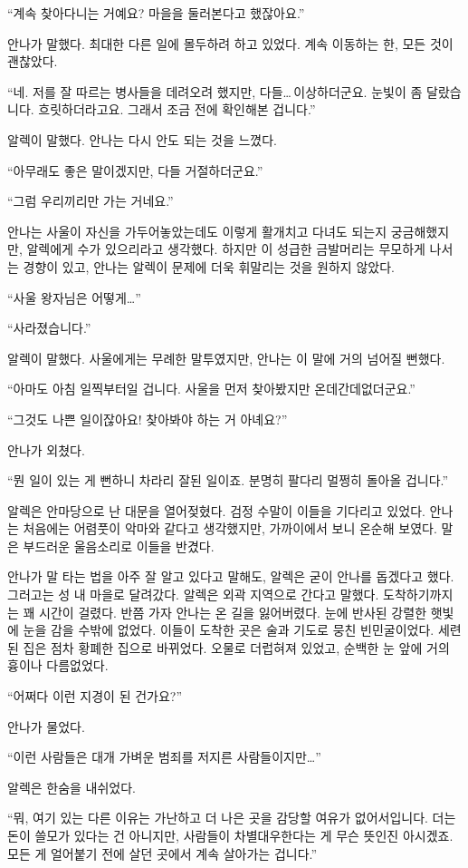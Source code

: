 ``계속 찾아다니는 거예요? 마을을 둘러본다고 했잖아요.''

안나가 말했다. 최대한 다른 일에 몰두하려 하고 있었다. 계속 이동하는 한, 모든 것이 괜찮았다.

``네. 저를 잘 따르는 병사들을 데려오려 했지만, 다들\ldots\,이상하더군요. 눈빛이 좀 달랐습니다. 흐릿하더라고요. 그래서 조금 전에 확인해본 겁니다.''

알렉이 말했다. 안나는 다시 안도 되는 것을 느꼈다.

``아무래도 좋은 말이겠지만, 다들 거절하더군요.''

``그럼 우리끼리만 가는 거네요.''

안나는 사울이 자신을 가두어놓았는데도 이렇게 활개치고 다녀도 되는지 궁금해했지만, 알렉에게 수가 있으리라고 생각했다. 하지만 이 성급한 금발머리는 무모하게 나서는 경향이 있고, 안나는 알렉이 문제에 더욱 휘말리는 것을 원하지 않았다.

``사울 왕자님은 어떻게\ldots''

``사라졌습니다.''

알렉이 말했다. 사울에게는 무례한 말투였지만, 안나는 이 말에 거의 넘어질 뻔했다.

``아마도 아침 일찍부터일 겁니다. 사울을 먼저 찾아봤지만 온데간데없더군요.''

``그것도 나쁜 일이잖아요! 찾아봐야 하는 거 아녜요?''

안나가 외쳤다.

``뭔 일이 있는 게 뻔하니 차라리 잘된 일이죠. 분명히 팔다리 멀쩡히 돌아올 겁니다.''

알렉은 안마당으로 난 대문을 열어젖혔다. 검정 수말이 이들을 기다리고 있었다. 안나는 처음에는 어렴풋이 악마와 같다고 생각했지만, 가까이에서 보니 온순해 보였다. 말은 부드러운 울음소리로 이들을 반겼다.

안나가 말 타는 법을 아주 잘 알고 있다고 말해도, 알렉은 굳이 안나를 돕겠다고 했다. 그러고는 성 내 마을로 달려갔다. 알렉은 외곽 지역으로 간다고 말했다. 도착하기까지는 꽤 시간이 걸렸다. 반쯤 가자 안나는 온 길을 잃어버렸다. 눈에 반사된 강렬한 햇빛에 눈을 감을 수밖에 없었다. 이들이 도착한 곳은 술과 기도로 뭉친 빈민굴이었다. 세련된 집은 점차 황폐한 집으로 바뀌었다. 오물로 더럽혀져 있었고, 순백한 눈 앞에 거의 흉이나 다름없었다.

``어쩌다 이런 지경이 된 건가요?''

안나가 물었다.

``이런 사람들은 대개 가벼운 범죄를 저지른 사람들이지만\ldots''

알렉은 한숨을 내쉬었다.

``뭐, 여기 있는 다른 이유는 가난하고 더 나은 곳을 감당할 여유가 없어서입니다. 더는 돈이 쓸모가 있다는 건 아니지만, 사람들이 차별대우한다는 게 무슨 뜻인진 아시겠죠. 모든 게 얼어붙기 전에 살던 곳에서 계속 살아가는 겁니다.''

